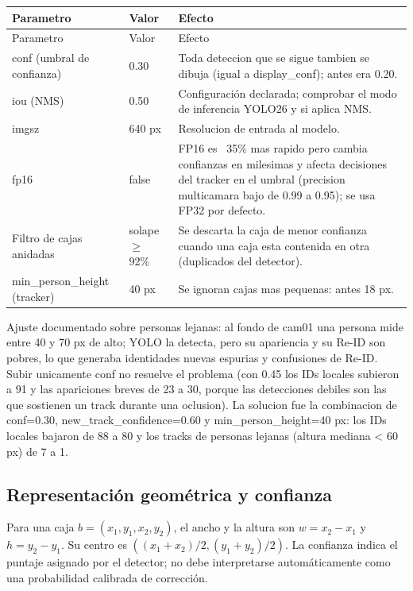 \documentclass[12pt,letterpaper]{article}
\begin{document}
\begin{longtable}{P{0.28\textwidth}P{0.22\textwidth}P{0.42\textwidth}}
\toprule

Parametro & Valor & Efecto \\

\midrule
\endfirsthead
\toprule
Parametro & Valor & Efecto \\
\midrule
\endhead

conf (umbral de confianza) & 0.30 & Toda deteccion que se sigue tambien se dibuja (igual a display\_\allowbreak conf); antes era 0.20. \\

iou (NMS) & 0.50 & Configuración declarada; comprobar el modo de inferencia YOLO26 y si aplica NMS. \\

imgsz & 640 px & Resolucion de entrada al modelo. \\

fp16 & false & FP16 es ~35\% mas rapido pero cambia confianzas en milesimas y afecta decisiones del tracker en el umbral (precision multicamara bajo de 0.99 a 0.95); se usa FP32 por defecto. \\

Filtro de cajas anidadas & solape $\geq$ 92\% & Se descarta la caja de menor confianza cuando una caja esta contenida en otra (duplicados del detector). \\

min\_\allowbreak person\_\allowbreak height (tracker) & 40 px & Se ignoran cajas mas pequenas: antes 18 px. \\

\bottomrule
\end{longtable}
\endgroup

Ajuste documentado sobre personas lejanas: al fondo de cam01 una persona mide entre 40 y 70 px de alto; YOLO la detecta, pero su apariencia y su Re-ID son pobres, lo que generaba identidades nuevas espurias y confusiones de Re-ID. Subir unicamente conf no resuelve el problema (con 0.45 los IDs locales subieron a 91 y las apariciones breves de 23 a 30, porque las detecciones debiles son las que sostienen un track durante una oclusion). La solucion fue la combinacion de conf=0.30, new\_\allowbreak track\_\allowbreak confidence=0.60 y min\_\allowbreak person\_\allowbreak height=40 px: los IDs locales bajaron de 88 a 80 y los tracks de personas lejanas (altura mediana < 60 px) de 7 a 1.


\subsection{Representación geométrica y confianza}
Para una caja $b=(x_1,y_1,x_2,y_2)$, el ancho y la altura son $w=x_2-x_1$ y $h=y_2-y_1$. Su centro es $((x_1+x_2)/2,(y_1+y_2)/2)$. La confianza indica el puntaje asignado por el detector; no debe interpretarse automáticamente como una probabilidad calibrada de corrección.
\end{document}

